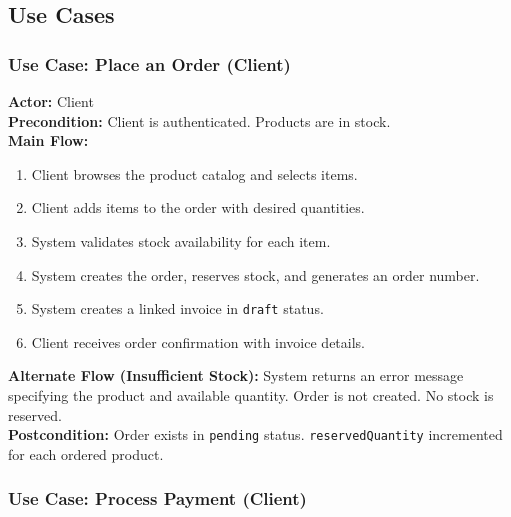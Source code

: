 \documentclass[12pt,onecolumn]{IEEEtran}
\begin{document}
\subsection{Use Cases}

\subsubsection{Use Case: Place an Order (Client)}

\begin{tcolorbox}[reqbox,title={UC-01: Place Order}]
\textbf{Actor:} Client \\
\textbf{Precondition:} Client is authenticated. Products are in stock. \\
\textbf{Main Flow:}
\begin{enumerate}[leftmargin=1.5em]
  \item Client browses the product catalog and selects items.
  \item Client adds items to the order with desired quantities.
  \item System validates stock availability for each item.
  \item System creates the order, reserves stock, and generates an order number.
  \item System creates a linked invoice in \texttt{draft} status.
  \item Client receives order confirmation with invoice details.
\end{enumerate}
\textbf{Alternate Flow (Insufficient Stock):} System returns an error message specifying the product and available quantity. Order is not created. No stock is reserved. \\
\textbf{Postcondition:} Order exists in \texttt{pending} status. \texttt{reservedQuantity} incremented for each ordered product.
\end{tcolorbox}

\subsubsection{Use Case: Process Payment (Client)}
\end{document}
